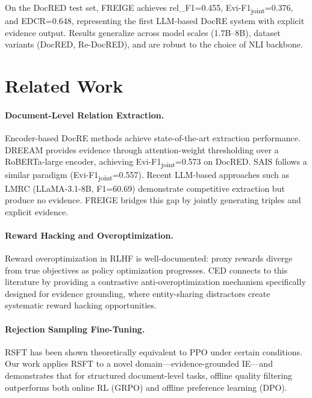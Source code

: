 \documentclass[11pt,a4paper]{article}
\newcommand{\method}{FREIGE}
\newcommand{\edcr}{EDCR}
\begin{document}
On the DocRED test set, \method{} achieves rel\_F1=0.455, Evi-F1\textsubscript{joint}=0.376, and \edcr{}=0.648, representing the first LLM-based DocRE system with explicit evidence output.
Results generalize across model scales (1.7B--8B), dataset variants (DocRED, Re-DocRED), and are robust to the choice of NLI backbone.

\section{Related Work}
\label{sec:related}

\paragraph{Document-Level Relation Extraction.}
Encoder-based DocRE methods achieve state-of-the-art extraction performance.
DREEAM provides evidence through attention-weight thresholding over a RoBERTa-large encoder, achieving Evi-F1\textsubscript{joint}=0.573 on DocRED.
SAIS follows a similar paradigm (Evi-F1\textsubscript{joint}=0.557).
Recent LLM-based approaches such as LMRC (LLaMA-3.1-8B, F1=60.69) demonstrate competitive extraction but produce no evidence.
\method{} bridges this gap by jointly generating triples and explicit evidence.

\paragraph{Reward Hacking and Overoptimization.}
Reward overoptimization in RLHF is well-documented: proxy rewards diverge from true objectives as policy optimization progresses.
CED connects to this literature by providing a contrastive anti-overoptimization mechanism specifically designed for evidence grounding, where entity-sharing distractors create systematic reward hacking opportunities.

\paragraph{Rejection Sampling Fine-Tuning.}
RSFT has been shown theoretically equivalent to PPO under certain conditions.
Our work applies RSFT to a novel domain---evidence-grounded IE---and demonstrates that for structured document-level tasks, offline quality filtering outperforms both online RL (GRPO) and offline preference learning (DPO).
\end{document}

